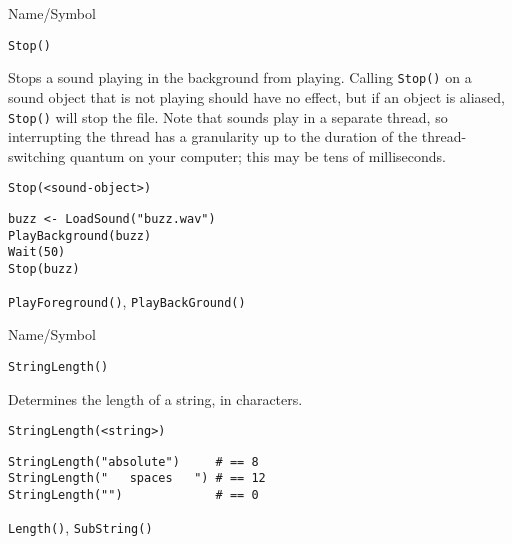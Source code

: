 \rl


\begin{desc}{Name/Symbol}
\item[Name/Symbol]  	\verb+Stop()+	

\item[Description] Stops a sound playing in the background from
  playing.  Calling \verb+Stop()+ on a sound object that is not
  playing should have no effect, but if an object is aliased,
  \verb+Stop()+ will stop the file.  Note that sounds play in a
  separate thread, so interrupting the thread has a granularity up to
  the duration of the thread-switching quantum on your computer; this
  may be tens of milliseconds.

\item[Usage]
\begin{verbatim}
Stop(<sound-object>)
\end{verbatim}

\item[Example]     	
\begin{verbatim}
buzz <- LoadSound("buzz.wav")
PlayBackground(buzz)
Wait(50)
Stop(buzz)
\end{verbatim}

\item[See Also]    	\verb+PlayForeground()+, \verb+PlayBackGround()+
\end{desc}

\rl


\begin{desc}{Name/Symbol}
\item[Name/Symbol]  	\verb+StringLength()+

\item[Description] 	Determines the length of a string, in characters.

\item[Usage]
\begin{verbatim}
StringLength(<string>)
\end{verbatim}

\item[Example]     	
\begin{verbatim}
StringLength("absolute")     # == 8
StringLength("   spaces   ") # == 12
StringLength("")             # == 0
\end{verbatim}

\item[See Also]    	\verb+Length()+, \verb+SubString()+
\end{desc}

\rl


